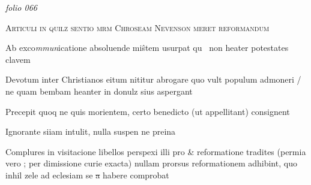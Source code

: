\documentclass[12pt, a4paper]{book}
\begin{document}
\textit{folio 066}


 	
 		
				\begin{center} \begin{large} {\scshape Articuli in quilz sentio mrm Chroseam Nevenson meret reformandum } \end{large} \end{center}
			
 		
				\marginpar[\vspace{0.5cm}{\textcolor{Gray}{Orphen}}]{}
			
 		
 			
			
 			
		\ifthenelse{\isodd{\thepage}}
		{\reversemarginpar}
		{\normalmarginpar}
		Ab exco\textit{mmun}icatione absoluende mi\^stem usurpat qu  non heater potestates clavem
 		
 		
 			
				\marginpar[\vspace{0.5cm}{\textcolor{Gray}{2}}]{}
			
 			
		\ifthenelse{\isodd{\thepage}}
		{\reversemarginpar}
		{\normalmarginpar}
		Devotum inter Christianos eitum nititur abrogare  quo vult populum admoneri / ne quam bembam heanter in donulz sius aspergant
 		

 		
 			
				\marginpar[\vspace{0.5cm}{\textcolor{Gray}{3}}]{}
			
 			
		\ifthenelse{\isodd{\thepage}}
		{\reversemarginpar}
		{\normalmarginpar}
		Precepit quoq ne quis morientem, certo benedicto (ut appellitant) consignent
 			
 		
 			
				\marginpar[\vspace{0.5cm}{\textcolor{Gray}{4}}]{}
			
 			
		\ifthenelse{\isodd{\thepage}}
		{\reversemarginpar}
		{\normalmarginpar}
		Ignorante siiam intulit, nulla suspen ne 
			preina
 		
		
			
				\marginpar[\vspace{0.5cm}{\textcolor{Gray}{5}}]{}
			
			
		\ifthenelse{\isodd{\thepage}}
		{\reversemarginpar}
		{\normalmarginpar}
		Complures in visitacione libellos perspexi illi pro \& reformatione tradites (permia vero ; per dimissione curie exacta) nullam prorsus reformationem adhibint, quo inhil zele ad eclesiam se\sout{ a} habere comprobat
		
\end{document}
